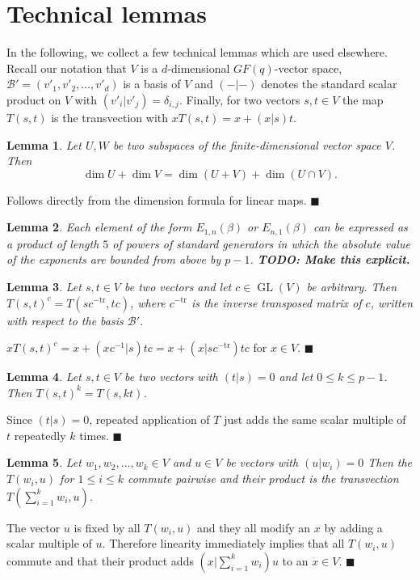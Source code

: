 \documentclass[a4paper,11pt]{article}
\def\GL{\operatorname{GL}}
\newcommand{\fixme}[1]{\textbf{#1}}
\newcommand{\tr}{\mathrm{tr}}
\newcommand{\proofend}{\hfill$\blacksquare$}
\newcommand{\B}{\mathcal{B}}
\newtheorem{lemma}{Lemma}
\begin{document}
\section{Technical lemmas}

In the following, we collect a few technical lemmas which are used
elsewhere. Recall our notation that $V$ is a $d$-dimensional $GF(q)$-vector
space, $\B' = (v'_1, v'_2, \ldots, v'_d)$ is a basis of $V$ and
$(-|-)$ denotes the standard scalar product on $V$ with $(v'_i|v'_j) =
\delta_{i,j}$. Finally, for two vectors $s,t \in V$ the
map $T(s,t)$ is the transvection with $xT(s,t) = x + (x|s)t$.

\begin{lemma}
\label{dimformula}
Let $U,W$ be two subspaces of the finite-dimensional vector space $V$.
Then
\[ \dim U + \dim V = \dim(U+V) + \dim(U \cap V). \]
\end{lemma}
\proof Follows directly from the dimension formula for linear maps.
\proofend

\begin{lemma}
\label{transvecs}
Each element of the form $E_{1,n}(\beta)$ or $E_{n,1}(\beta)$ can be
expressed as a product of length $5$ of powers of standard generators
in which the absolute value of the exponents are bounded from above 
by $p-1$. \fixme{TODO: Make this explicit.}
\end{lemma}

\begin{lemma}
\label{conjtransv}
Let $s,t \in V$ be two vectors and let $c \in \GL(V)$ be arbitrary. 
Then $T(s,t)^c = T(sc^{-\tr},tc)$,
where $c^{-\tr}$ is the inverse transposed matrix of $c$, written
with respect to the basis $\B'$.
\end{lemma}
\proof
$xT(s,t)^c = x + (xc^{-1}|s)tc = x + (x|sc^{-\tr})tc$ for $x \in V$. 
\proofend

\begin{lemma}
\label{powertrans}
Let $s,t \in V$ be two vectors with $(t|s)=0$ and let 
$0 \le k \le p-1$. Then $T(s,t)^k = T(s,kt)$.
\end{lemma}
\proof Since $(t|s)=0$, repeated application of $T$ just adds the same
scalar multiple of $t$ repeatedly $k$ times.
\proofend

\begin{lemma}
\label{lincombtrans}
Let $w_1, w_2, \ldots, w_k \in V$ and $u \in V$ be vectors with 
$(u|w_i)=0$
Then the $T(w_i,u)$ for $1 \le i \le k$ commute pairwise and their 
product is the transvection $T(\sum_{i=1}^k w_i,u)$.
\end{lemma}
\proof The vector $u$ is fixed by all $T(w_i,u)$ and they all modify
an $x$ by adding a scalar multiple of $u$. Therefore linearity
immediately implies that all $T(w_i,u)$ commute and that their product adds
$(x|\sum_{i=1}^k w_i)u$ to an $x \in V$.
\proofend
\end{document}
